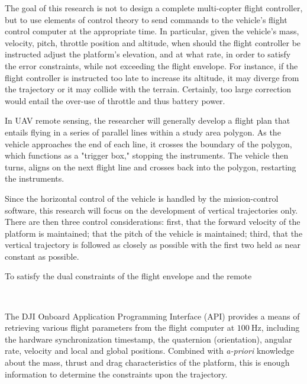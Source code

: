 The goal of this research is not to design a complete multi-copter flight controller, but to use elements of control theory to send commands to the vehicle's flight control computer at the appropriate time. In particular, given the vehicle's mass, velocity, pitch, throttle position and altitude, when should the flight controller be instructed adjust the platform's elevation, and at what rate, in order to satisfy the error constraints, while not exceeding the flight envelope. For instance, if the flight controller is instructed too late to increase its altitude, it may diverge from the trajectory or it may collide with the terrain. Certainly, too large correction would entail the over-use of throttle and thus battery power.

In UAV remote sensing, the researcher will generally develop a flight plan that entails flying in a series of parallel lines within a study area polygon. As the vehicle approaches the end of each line, it crosses the boundary of the polygon, which functions as a "trigger box," stopping the instruments. The vehicle then turns, aligns on the next flight line and crosses back into the polygon, restarting the instruments. 

Since the horizontal control of the vehicle is handled by the mission-control software, this research will focus on the development of vertical trajectories only. There are then three control considerations: first, that the forward velocity of the platform is maintained; that the pitch of the vehicle is maintained; third, that the vertical trajectory is followed as closely as possible with the first two held as near constant as possible.

To satisfy the dual constraints of the flight envelope and the remote


~~~


The DJI Onboard Application Programming Interface (API) \cite{DJI2018} provides a means of retrieving various flight parameters from the flight computer at $\SI{100}\Hz$, including the hardware synchronization timestamp, the quaternion (orientation), angular rate, velocity and local and global positions. Combined with \emph{a-priori} knowledge about the mass, thrust and drag characteristics of the platform, this is enough information to determine the constraints upon the trajectory.




